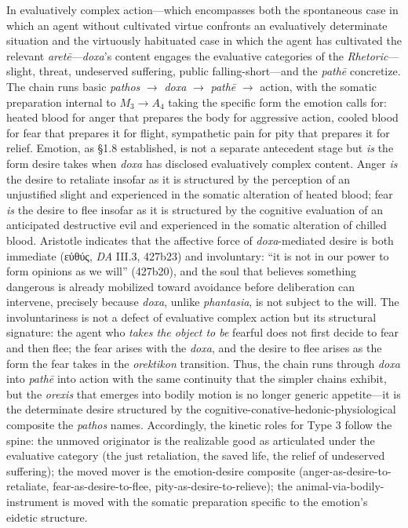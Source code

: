 \documentclass{article}
\newcommand{\gk}[1]{{\greekfont #1}}
\begin{document}
In evaluatively complex action---which encompasses both the spontaneous case in which an agent without cultivated virtue confronts an evaluatively determinate situation and the virtuously habituated case in which the agent has cultivated the relevant \textit{aretē}---\textit{doxa}'s content engages the evaluative categories of the \textit{Rhetoric}---slight, threat, undeserved suffering, public falling-short---and the \textit{pathē} concretize. The chain runs basic \textit{pathos} $\rightarrow$ \textit{doxa} $\rightarrow$ \textit{pathē} $\rightarrow$ action, with the somatic preparation internal to $M_3 \rightarrow A_4$ taking the specific form the emotion calls for: heated blood for anger that prepares the body for aggressive action, cooled blood for fear that prepares it for flight, sympathetic pain for pity that prepares it for relief. Emotion, as \S 1.8 established, is not a separate antecedent stage but \textit{is} the form desire takes when \textit{doxa} has disclosed evaluatively complex content. Anger \textit{is} the desire to retaliate insofar as it is structured by the perception of an unjustified slight and experienced in the somatic alteration of heated blood; fear \textit{is} the desire to flee insofar as it is structured by the cognitive evaluation of an anticipated destructive evil and experienced in the somatic alteration of chilled blood. Aristotle indicates that the affective force of \textit{doxa}-mediated desire is both immediate (\gk{εὐθύς}, \textit{DA} III.3, 427b23) and involuntary: ``it is not in our power to form opinions as we will'' (427b20), and the soul that believes something dangerous is already mobilized toward avoidance before deliberation can intervene, precisely because \textit{doxa}, unlike \textit{phantasia}, is not subject to the will. The involuntariness is not a defect of evaluative complex action but its structural signature: the agent who \textit{takes the object to be} fearful does not first decide to fear and then flee; the fear arises with the \textit{doxa}, and the desire to flee arises as the form the fear takes in the \textit{orektikon} transition. Thus, the chain runs through \textit{doxa} into \textit{pathē} into action with the same continuity that the simpler chains exhibit, but the \textit{orexis} that emerges into bodily motion is no longer generic appetite---it is the determinate desire structured by the cognitive-conative-hedonic-physiological composite the \textit{pathos} names. Accordingly, the kinetic roles for Type 3 follow the spine: the unmoved originator is the realizable good as articulated under the evaluative category (the just retaliation, the saved life, the relief of undeserved suffering); the moved mover is the emotion-desire composite (anger-as-desire-to-retaliate, fear-as-desire-to-flee, pity-as-desire-to-relieve); the animal-via-bodily-instrument is moved with the somatic preparation specific to the emotion's eidetic structure.
\end{document}
